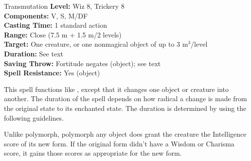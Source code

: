 {Transmutation}
{
	\textbf{Level:}
	Wiz 8, Trickery 8\\
	\textbf{Components:}
	V, S, M/DF\\
	\textbf{Casting Time:}
	1 standard action\\
	\textbf{Range:}
	Close (7.5 m + 1.5 m/2 levels)\\
	\textbf{Target:}
	One creature, or one nonmagical object of up to 3 m$^3$/level\\
	\textbf{Duration:}
	See text\\
	\textbf{Saving Throw:}
	Fortitude negates (object); see text\\
	\textbf{Spell Resistance:}
	Yes (object)\\
}
{
	This spell functions like , except that it changes one object or creature into another. The duration of the spell depends on how radical a change is made from the original state to its enchanted state. The duration is determined by using the following guidelines.



	Unlike polymorph, polymorph any object does grant the creature the Intelligence score of its new form. If the original form didn't have a Wisdom or Charisma score, it gains those scores as appropriate for the new form.

}
